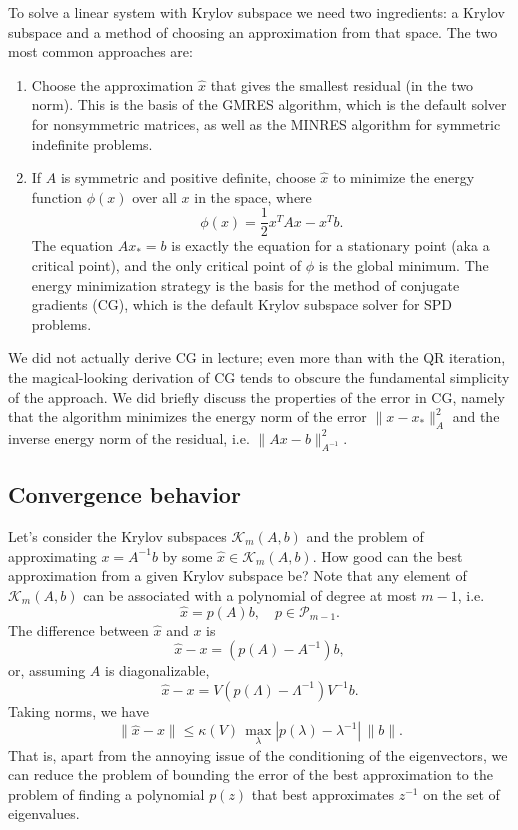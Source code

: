 \documentclass[12pt, leqno]{article}
\newcommand{\calK}{\mathcal{K}}
\newcommand{\calP}{\mathcal{P}}
\begin{document}
To solve a linear system with Krylov subspace we need two ingredients:
a Krylov subspace and a method of choosing an approximation from that
space.  The two most common approaches are:
\begin{enumerate}
\item
  Choose the approximation $\hat{x}$ that gives the smallest residual
  (in the two norm).  This is the basis of the GMRES algorithm, which
  is the default solver for nonsymmetric matrices, as well as the
  MINRES algorithm for symmetric indefinite problems.
\item
  If $A$ is symmetric and positive definite, choose $\hat{x}$ to minimize
  the energy function $\phi(x)$ over all $x$ in the space, where
  \[
    \phi(x) = \frac{1}{2} x^T A x - x^T b.
  \]
  The equation $Ax_* = b$ is exactly the equation for a stationary
  point (aka a critical point), and the only critical point of $\phi$
  is the global minimum.  The energy minimization strategy is the
  basis for the method of conjugate gradients (CG), which is the
  default Krylov subspace solver for SPD problems.
\end{enumerate}
We did not actually derive CG in lecture; even more than with the QR
iteration, the magical-looking derivation of CG tends to obscure the
fundamental simplicity of the approach.  We did briefly discuss the
properties of the error in CG, namely that the algorithm minimizes the
energy norm of the error $\|x-x_*\|_A^2$ and the inverse energy norm
of the residual, i.e. $\|Ax-b\|_{A^{-1}}^2$.

\subsection{Convergence behavior}

Let's consider the Krylov subspaces $\calK_{m}(A,b)$ and the problem
of approximating $x = A^{-1} b$ by some $\hat{x} \in \calK_m(A,b)$.
How good can the best approximation from a given Krylov subspace be?
Note that any element of $\calK_m(A,b)$ can be associated with a
polynomial of degree at most $m-1$, i.e.
\[
  \hat{x} = p(A) b, \quad p \in \calP_{m-1}.
\]
The difference between $\hat{x}$ and $x$ is
\[
  \hat{x}-x = (p(A)-A^{-1})b,
\]
or, assuming $A$ is diagonalizable,
\[
  \hat{x}-x = V (p(\Lambda)-\Lambda^{-1}) V^{-1} b.
\]
Taking norms, we have
\[
  \|\hat{x}-x\| \leq \kappa(V) \, \max_{\lambda}
  |p(\lambda)-\lambda^{-1}| \, \|b\|.
\]
That is, apart from the annoying issue of the conditioning of the
eigenvectors, we can reduce the problem of bounding the error of
the best approximation to the problem of finding a polynomial
$p(z)$ that best approximates $z^{-1}$ on the set of eigenvalues.
\end{document}

